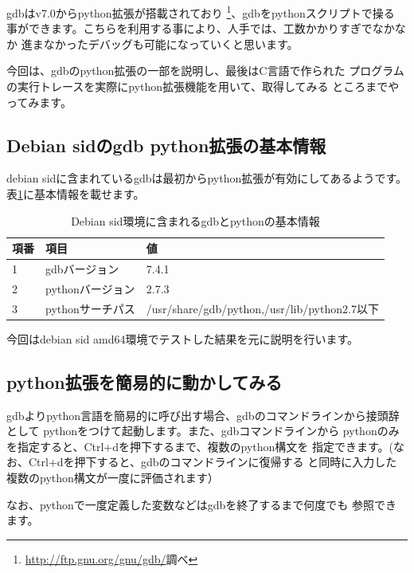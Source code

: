 \documentclass[mingoth,a4paper]{jsarticle}
\begin{document}
 gdbはv7.0からpython拡張が搭載されており
\footnote{\url{http://ftp.gnu.org/gnu/gdb/}調べ}、gdbをpythonスクリプトで操る
事ができます。こちらを利用する事により、人手では、工数かかりすぎでなかなか
進まなかったデバッグも可能になっていくと思います。

 今回は、gdbのpython拡張の一部を説明し、最後はC言語で作られた
プログラムの実行トレースを実際にpython拡張機能を用いて、取得してみる
ところまでやってみます。

\subsection{Debian sidのgdb python拡張の基本情報}

 debian sidに含まれているgdbは最初からpython拡張が有効にしてあるようです。
表\ref{tab:gdb-python-basic-info}に基本情報を載せます。

\begin{table}[ht]
\begin{center}
\small
\begin{tabular}{|l|l|l|}
\hline
項番 & 項目 & 値 \\
\hline
1 & gdbバージョン & 7.4.1 \\
2 & pythonバージョン & 2.7.3 \\
3 & pythonサーチパス & /usr/share/gdb/python,/usr/lib/python2.7以下 \\
\hline
\end{tabular}
\caption{Debian sid環境に含まれるgdbとpythonの基本情報}
\label{tab:gdb-python-basic-info}
\end{center}
\end{table}

 今回はdebian sid amd64環境でテストした結果を元に説明を行います。

\subsection{python拡張を簡易的に動かしてみる}

 gdbよりpython言語を簡易的に呼び出す場合、gdbのコマンドラインから接頭辞として
pythonをつけて起動します。また、gdbコマンドラインから
pythonのみを指定すると、Ctrl+dを押下するまで、複数のpython構文を
指定できます。(なお、Ctrl+dを押下すると、gdbのコマンドラインに復帰する
と同時に入力した複数のpython構文が一度に評価されます）

 なお、pythonで一度定義した変数などはgdbを終了するまで何度でも
参照できます。
\end{document}
